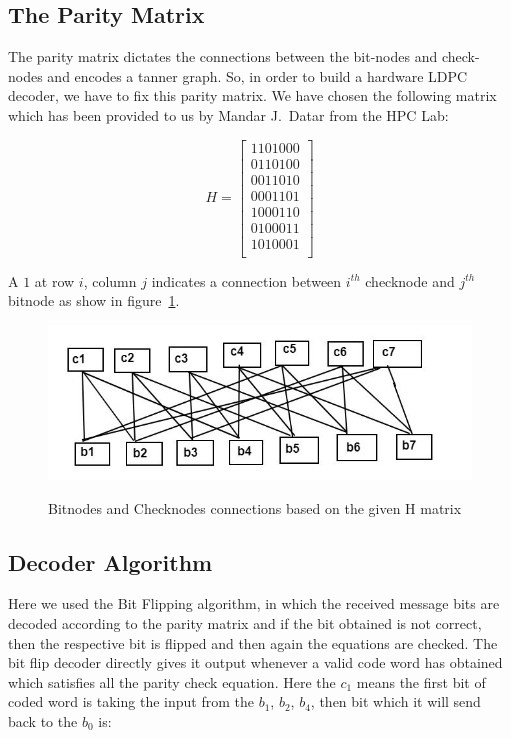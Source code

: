 \documentclass[11pt, a4paper]{article}
\begin{document}
\subsection{The Parity Matrix}
The parity matrix dictates the connections between the bit-nodes and
check-nodes and encodes a tanner graph. So, in order to build a hardware LDPC
decoder, we have to fix this parity matrix. We have chosen the following
matrix which has been provided to us by Mandar J.~Datar from the HPC Lab:

\[
H = \begin{bmatrix}
1 1 0 1 0 0 0 \\
0 1 1 0 1 0 0 \\
0 0 1 1 0 1 0 \\
0 0 0 1 1 0 1 \\
1 0 0 0 1 1 0 \\
0 1 0 0 0 1 1 \\
1 0 1 0 0 0 1 \\
\end{bmatrix}
\]

A $1$ at row $i$, column $j$ indicates a connection between $i^{th}$ checknode
and $j^{th}$ bitnode as show in figure~\ref{fig:bc}.

\begin{figure}[hbt]
\includegraphics{pic1.jpg}
\label{fig:bc}
\caption{Bitnodes and Checknodes connections based on the given H matrix}
\end{figure}

\subsection{Decoder Algorithm}
Here we used the Bit Flipping algorithm, in which the received message bits
are decoded according to the parity matrix and if the bit obtained is not
correct, then the respective bit is flipped and then again the equations are
checked. The bit flip decoder directly gives it output whenever a valid code
word has obtained which satisfies all the parity check equation.
Here the $c_1$ means the first bit of coded word is taking the input from the
$b_1$, $b_2$, $b_4$, then bit which it will send back to the $b_0$ is:
\end{document}

